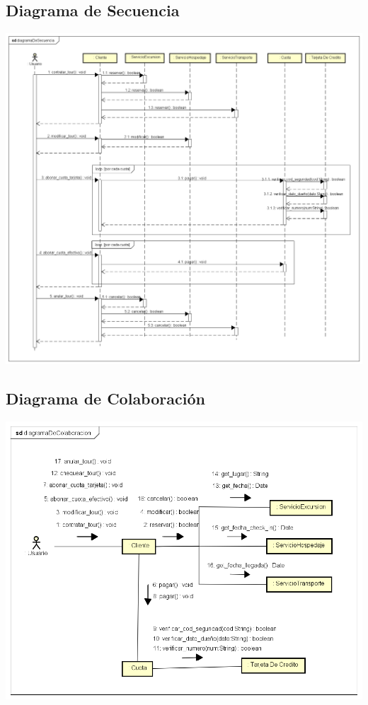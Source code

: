 \documentclass[12pt,a4paper]{article}
\begin{document}
	\subsection{Diagrama de Secuencia}
		\includegraphics[scale=0.45]{diagramaDeSecuencia.png}

	\subsection{Diagrama de Colaboración}
		\includegraphics[scale=0.7]{diagramaDeColaboracion.png}
\end{document}
